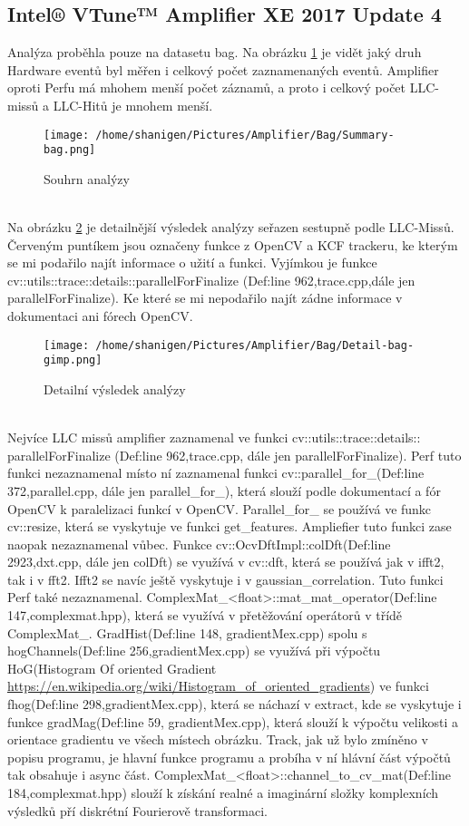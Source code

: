 \documentclass{article}
\begin{document}
\subsection{Intel® VTune™ Amplifier XE 2017 Update 4}
Analýza proběhla pouze na datasetu bag. Na obrázku \ref{Amp-summary} je vidět jaký druh Hardware eventů byl měřen i celkový počet zaznamenaných eventů. Amplifier oproti Perfu má mhohem menší počet záznamů, a proto i celkový počet LLC-missů a LLC-Hitů je mnohem menší.
\begin{figure}[h!]
	\centering
	\texttt{[image: /home/shanigen/Pictures/Amplifier/Bag/Summary-bag.png]}
	\caption{Souhrn analýzy}
	\label{Amp-summary}
\end{figure}
\\
Na obrázku \ref{Amp-detail} je detailnější výsledek analýzy seřazen sestupně podle LLC-Missů. Červeným puntíkem jsou označeny funkce z OpenCV a KCF trackeru, ke kterým se mi podařilo najít informace o užití a funkci. Vyjímkou je funkce cv::utils::trace::details::parallelForFinalize (Def:line 962,trace.cpp,dále jen parallelForFinalize). Ke které se mi nepodařilo najít zádne informace v dokumentaci ani fórech OpenCV.
\begin{figure}[h!]
	\centering
	\texttt{[image: /home/shanigen/Pictures/Amplifier/Bag/Detail-bag-gimp.png]}
	\caption{Detailní výsledek analýzy}
	\label{Amp-detail}
\end{figure}
\\
Nejvíce LLC missů amplifier zaznamenal ve funkci cv::utils::trace::details::
parallelForFinalize (Def:line 962,trace.cpp, dále jen parallelForFinalize). Perf tuto funkci nezaznamenal místo ní zaznamenal funkci cv::parallel\_for\_(Def:line 372,parallel.cpp, dále jen parallel\_for\_), která slouží podle dokumentací a fór OpenCV k paralelizaci funkcí v OpenCV. Parallel\_for\_ se používá ve funkc cv::resize, která se vyskytuje ve funkci get\_features. Ampliefier tuto funkci zase naopak nezaznamenal vůbec. Funkce cv::OcvDftImpl::colDft(Def:line 2923,dxt.cpp, dále jen colDft) se využívá v cv::dft, která se používá jak v ifft2, tak i v fft2. Ifft2 se navíc ještě vyskytuje i v gaussian\_correlation. Tuto funkci Perf také nezaznamenal. ComplexMat\_<float>::mat\_mat\_operator(Def:line 147,complexmat.hpp), která se využívá v přetěžování operátorů v třídě ComplexMat\_. GradHist(Def:line 148, gradientMex.cpp) spolu s hogChannels(Def:line 256,gradientMex.cpp) se využívá při výpočtu HoG(Histogram Of oriented Gradient \url{https://en.wikipedia.org/wiki/Histogram_of_oriented_gradients}) ve funkci fhog(Def:line 298,gradientMex.cpp), která se náchazí v extract, kde se vyskytuje i funkce gradMag(Def:line 59, gradientMex.cpp), která slouží k výpočtu velikosti a orientace gradientu ve všech místech obrázku. Track, jak už bylo zmíněno v popisu programu, je hlavní funkce programu a probíha v ní hlávní část výpočtů tak obsahuje i async část.  ComplexMat\_<float>::channel\_to\_cv\_mat(Def:line 184,complexmat.hpp) slouží k získání realné a imaginární složky komplexních výsledků pří diskrétní Fourierově transformaci.
\end{document}
